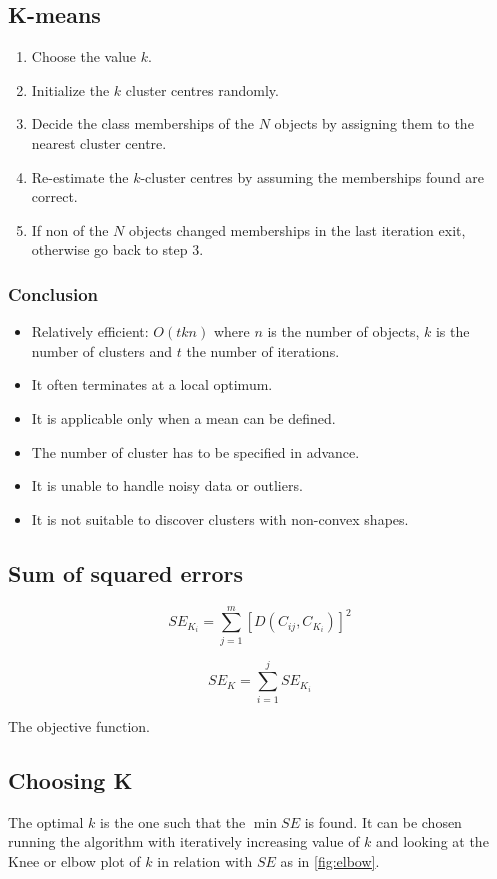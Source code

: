 	\subsection{K-means}

	\begin{enumerate}
		\item Choose the value $k$.
		\item Initialize the $k$ cluster centres randomly.
		\item Decide the class memberships of the $N$ objects by assigning them to the nearest cluster centre.
		\item Re-estimate the $k$-cluster centres by assuming the memberships found are correct.
		\item If non of the $N$ objects changed memberships in the last iteration exit, otherwise go back to step $3$.
	\end{enumerate}

		\subsubsection{Conclusion}

		\begin{itemize}
			\item Relatively efficient: $O(tkn)$ where $n$ is the number of objects, $k$ is the number of clusters and $t$ the number of iterations.
			\item It often terminates at a local optimum.
			\item It is applicable only when a mean can be defined.
			\item The number of cluster has to be specified in advance.
			\item It is unable to handle noisy data or outliers.
			\item It is not suitable to discover clusters with non-convex shapes.
		\end{itemize}

	\subsection{Sum of squared errors}

	$$SE_{K_i} = \sum\limits_{j=1}^m[D(C_{ij}, C_{K_i})]^2$$

	$$SE_K = \sum\limits_{i=1}^jSE_{K_i}$$

	The objective function.

	\subsection{Choosing K}
	The optimal $k$ is the one such that the $\min SE$ is found.
	It can be chosen running the algorithm with iteratively increasing value of $k$ and looking at the Knee or elbow plot of $k$ in relation with $SE$ as in \ref{fig:elbow}.

